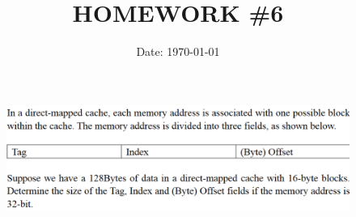 \documentclass[cn,12pt]{homework}
\title{HOMEWORK \#6} %
\date{Date: \today} %
\institute{ZHEJIANG UNIVERSITY\quad COLLEGE OF INFORMATION SCIENCE AND ELECTRONICS ENGINEERING} %
\begin{document}
\maketitle



\begin{problem}
\begin{figure}[h!]
  \centering
  \includegraphics[width=1\textwidth]{./figures/image1.png}
  \label{fig:pro1}
\end{figure}

\end{problem}
\end{document}
